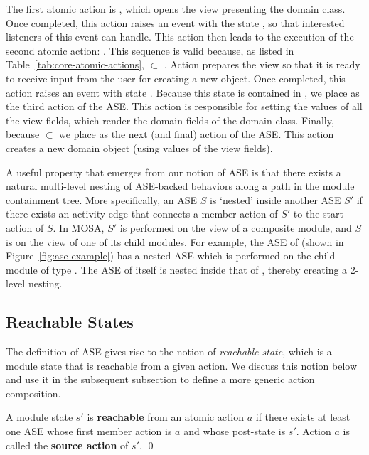 The first atomic action is , which opens the view presenting the domain class. Once completed, this action raises an event with the state , so that interested listeners of this event can handle. This action then leads to the execution of the second atomic action: . This sequence is valid because, as listed in Table~\ref{tab:core-atomic-actions},  $\subset$ . Action  prepares the view so that it is ready to receive input from the user for creating a new object. Once completed, this action raises an event with state .
%
Because this state is contained in , we place  as the third action of the ASE. This action is responsible for setting the values of all the view fields, which render the domain fields of the domain class.
Finally, because  $\subset$  we place  as the next (and final) action of the ASE. This action creates a new domain object (using values of the view fields).

A useful property that emerges from our notion of ASE is that there exists a natural multi-level nesting of ASE-backed behaviors along a path in the module containment tree. More specifically, an ASE $S$ is `nested' inside another ASE $S'$ if there exists an activity edge that connects a member action of $S'$ to the start action of $S$. In MOSA, $S'$ is performed on the view of a composite module, and $S$ is on the view of one of its child modules.
%
For example, the ASE of  (shown in Figure~\ref{fig:ase-example}) has a nested ASE which is performed on the child module of type . The ASE of  itself is nested inside that of , thereby creating a 2-level nesting.
\subsection{Reachable States} \label{sect:arch-reachable-states}
The definition of ASE gives rise to the notion of \textit{reachable state}, which is a module state that is reachable from a given action. We discuss this notion below and use it in the subsequent subsection to define a more generic action composition.
%
\begin{definition} \label{def:reachable-state}
A module state $s'$ is \textbf{reachable} from an atomic action $a$ if there exists at least one ASE whose first member action is $a$ and whose post-state is $s'$. Action $a$ is called the \textbf{source action} of $s'$. \qed
\end{definition}

